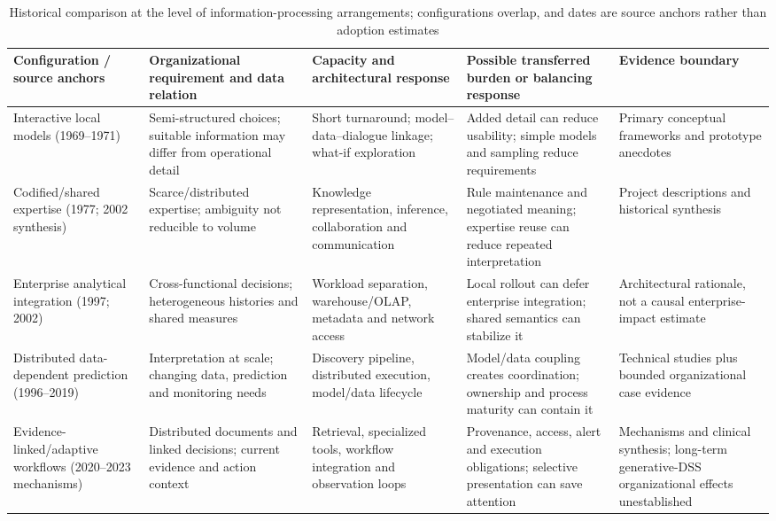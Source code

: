 \documentclass[journal]{IEEEtran}
\begin{document}
\begin{table}[t]
\caption{Historical comparison at the level of information-processing arrangements; configurations overlap, and dates are source anchors rather than adoption estimates}
\label{tab:history}
\centering\scriptsize\setlength{\tabcolsep}{4pt}
\begin{tabular}{p{}p{}p{}p{}p{}}
\toprule
Configuration / source anchors & Organizational requirement and data relation & Capacity and architectural response & Possible transferred burden or balancing response & Evidence boundary \\
\midrule
Interactive local models (1969--1971) \cite{little1969,gorry1971} & Semi-structured choices; suitable information may differ from operational detail & Short turnaround; model--data--dialogue linkage; what-if exploration & Added detail can reduce usability; simple models and sampling reduce requirements & Primary conceptual frameworks and prototype anecdotes \\
Codified/shared expertise (1977; 2002 synthesis) \cite{feigenbaum1977,shim2002} & Scarce/distributed expertise; ambiguity not reducible to volume & Knowledge representation, inference, collaboration and communication & Rule maintenance and negotiated meaning; expertise reuse can reduce repeated interpretation & Project descriptions and historical synthesis \\
Enterprise analytical integration (1997; 2002) \cite{chaudhuri1997,shim2002} & Cross-functional decisions; heterogeneous histories and shared measures & Workload separation, warehouse/OLAP, metadata and network access & Local rollout can defer enterprise integration; shared semantics can stabilize it & Architectural rationale, not a causal enterprise-impact estimate \\
Distributed data-dependent prediction (1996--2019) \cite{fayyad1996,Dean2004,amershi2019} & Interpretation at scale; changing data, prediction and monitoring needs & Discovery pipeline, distributed execution, model/data lifecycle & Model/data coupling creates coordination; ownership and process maturity can contain it & Technical studies plus bounded organizational case evidence \\
Evidence-linked/adaptive workflows (2020--2023 mechanisms) \cite{Lewis2020,Yao2023,Sutton2020} & Distributed documents and linked decisions; current evidence and action context & Retrieval, specialized tools, workflow integration and observation loops & Provenance, access, alert and execution obligations; selective presentation can save attention & Mechanisms and clinical synthesis; long-term generative-DSS organizational effects unestablished \\
\bottomrule
\end{tabular}
\end{table}
\end{document}
